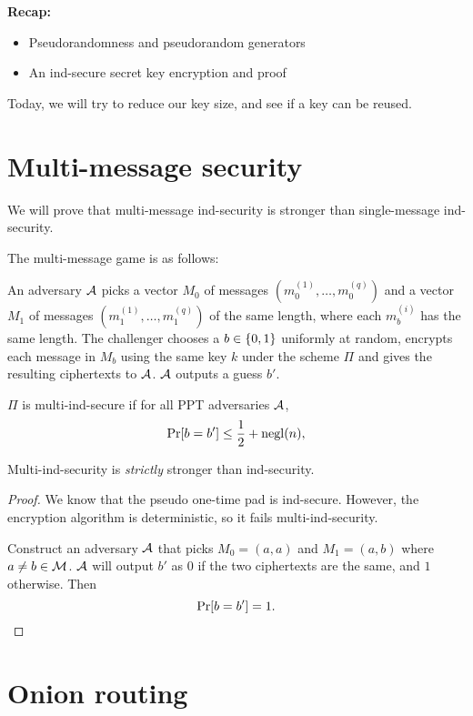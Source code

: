 
\textbf{Recap:}
\begin{itemize}
    \item Pseudorandomness and pseudorandom generators
    \item An ind-secure secret key encryption and proof
\end{itemize}

Today, we will try to reduce our key size, and see if a key can be reused.

\section{Multi-message security} \label{sec:sec:multi}

We will prove that multi-message ind-security is stronger than
single-message ind-security.

The multi-message game is as follows:
\begin{definition*}
    An adversary $\mathcal{A}$ picks a vector $M_0$ of messages
    $(m_0^{(1)}, \dots, m_0^{(q)})$ and a vector $M_1$ of messages
    $(m_1^{(1)}, \dots, m_1^{(q)})$ of the same length,
    where each $m_b^{(i)}$ has the same length.
    The challenger chooses a $b \in \{0, 1\}$ uniformly at random,
    encrypts each message in $M_b$ using the same key $k$ under the scheme
    $\Pi$ and gives the resulting ciphertexts to $\mathcal{A}$.
    $\mathcal{A}$ outputs a guess $b'$.

    $\Pi$ is multi-ind-secure if for all PPT adversaries $\mathcal{A}$,
    \[
        \Pr[b = b'] \leq \frac{1}{2} + \operatorname{negl}(n),
    \]
\end{definition*}
\begin{proposition}
    Multi-ind-security is \emph{strictly} stronger than ind-security.
\end{proposition}
\begin{proof}
    We know that the pseudo one-time pad is ind-secure.
    However, the encryption algorithm is deterministic, so it fails
    multi-ind-security.

    Construct an adversary $\mathcal{A}$ that picks $M_0 = (a, a)$ and
    $M_1 = (a, b)$ where $a \ne b \in \mathcal{M}$.
    $\mathcal{A}$ will output $b'$ as $0$ if the two ciphertexts are the same,
    and $1$ otherwise.
    Then \[
        \Pr[b = b'] = 1. \qedhere
    \] 
\end{proof}

\section{Onion routing} \label{sec:onion}

